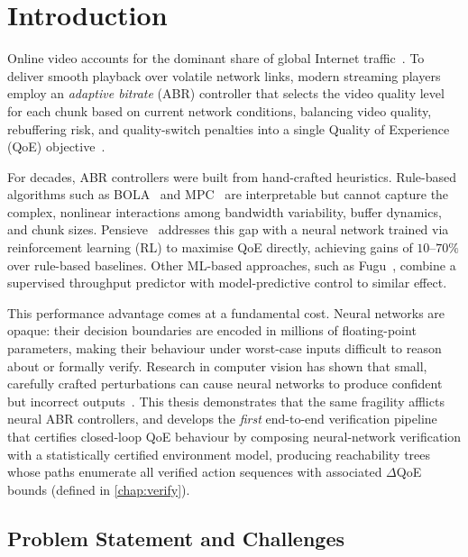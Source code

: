\documentclass[thesis]{uofithesis} %
\begin{document}
\section{Introduction}

    \label{chap:intro}
 
    Online video accounts for the dominant share of global Internet
    traffic~\cite{cloudinary-quality}.  To deliver smooth playback over
    volatile network links, modern streaming players employ an
    \emph{adaptive bitrate} (ABR) controller that selects
    the video quality level for each chunk based on current network
    conditions, balancing video quality, rebuffering risk, and
    quality-switch penalties into a single Quality of Experience (QoE)
    objective~\cite{pensieve}.

    For decades, ABR controllers were built from hand-crafted heuristics.
    Rule-based algorithms such as BOLA~\cite{bola} and
    MPC~\cite{mpc} are interpretable but cannot capture
    the complex, nonlinear interactions among bandwidth variability,
    buffer dynamics, and chunk sizes.  Pensieve~\cite{pensieve} addresses
    this gap with a neural network trained via reinforcement
    learning (RL) to maximise QoE directly, achieving
    gains of $10$--$70\%$ over rule-based baselines.  Other ML-based
    approaches, such as Fugu~\cite{fugu}, combine a supervised throughput
    predictor with model-predictive control to similar effect.

    This performance advantage comes at a fundamental cost.  Neural
    networks are opaque: their decision boundaries are encoded in
    millions of floating-point parameters, making their behaviour under
    worst-case inputs difficult to reason about or formally verify.
    Research in computer vision has shown that small, carefully
    crafted perturbations can cause neural networks to produce confident
    but incorrect outputs~\cite{attack}.  This thesis demonstrates that
    the same fragility afflicts neural ABR controllers, and develops
    the \emph{first} end-to-end verification pipeline that certifies closed-loop
    QoE behaviour by composing neural-network verification with a
    statistically certified environment model, producing reachability
    trees~\cite{tree} whose paths enumerate all verified action sequences with
    associated $\Delta$QoE bounds (defined in \ref{chap:verify}).

    \subsection{Problem Statement and Challenges}
    \label{subsec:problem}
 
\end{document}

